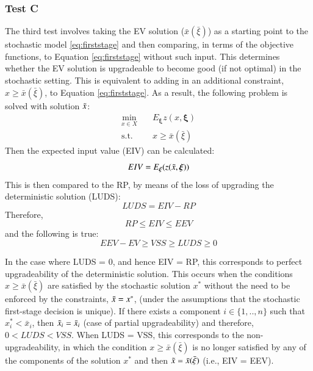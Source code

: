 \documentclass[../thesis.tex]{subfiles}
\begin{document}
\subsubsection{Test C}\label{sec:TestC}
The third test involves taking the EV solution ($\bar x(\bar \xi)$) as a starting point to the stochastic model \eqref{eq:firststage} and then comparing, in terms of the objective functions, to Equation \eqref{eq:firststage} without such input. This determines whether the EV solution is upgradeable to become good (if not optimal) in the stochastic setting. This is equivalent to adding in an additional constraint, $x \geq \bar x (\bar \xi)
$, to Equation \eqref{eq:firststage}. As a result, the following problem is solved with solution $\Tilde{x}$:
\vspace{-.5cm}
\begin{align}
    \min_{x\in X}\enspace\enspace &E_{\boldsymbol{\xi}} z(x,\boldsymbol{\xi}) \\
    \text{s.t. } \enspace&x \geq \bar x(\bar \xi)
\end{align}
Then the expected input value (EIV) can be calculated:
\begin{equation}\label{eq:EIV}
    EIV = E_{\boldsymbol{\xi}}(z(\Tilde{x},\boldsymbol{\xi}))
\end{equation}
This is then compared to the RP, by means of the loss of upgrading the deterministic solution (LUDS):
\begin{equation}\label{eq:LUDS}
    LUDS = EIV - RP
\end{equation}
Therefore,
\begin{equation}
    RP \leq EIV \leq EEV
\end{equation}
and the following is true:
\begin{equation}
    EEV - EV \geq VSS \geq LUDS \geq 0
\end{equation}

In the case where LUDS = 0, and hence EIV = RP, this corresponds to perfect upgradeability of the deterministic solution. This occurs when the conditions $x \geq \bar x (\bar \xi)$ are satisfied by the stochastic solution $x^{*}$ without the need to be enforced by the constraints, $\Tilde{x} = x^{*}$, (under the assumptions that the stochastic first-stage decision is unique). If there exists a component $i \in \{1, .., n\}$ such that $x_{i}^{*} < \bar x_{i}$, then $\Tilde{x}_{i} = \bar x_{i}$ (case of partial upgradeability) and therefore, $0 < LUDS < VSS$. When LUDS = VSS, this corresponds to the non-upgradeability, in which the condition $x \geq \bar x (\bar \xi)$ is no longer satisfied by any of the components of the solution $x^{*}$ and then $\Tilde{x} = \bar x (\bar \xi)$ (i.e., EIV = EEV).
\end{document}
